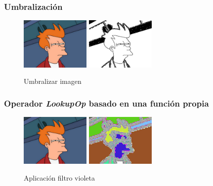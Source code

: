 \subsubsection{Umbralización}
\vskip0.3cm
\begin{figure}[H]
 \centering
  \includegraphics[width=0.3\textwidth]{imagenes/Fry.jpg}
  \includegraphics[width=0.3\textwidth]{imagenes/fryUmbralizado.jpg}
 \caption{Umbralizar imagen}
 \label{diseño}
\end{figure}
\subsubsection{Operador \textit{LookupOp} basado en una función propia}
\vskip0.3cm
\begin{figure}[H]
 \centering
  \includegraphics[width=0.3\textwidth]{imagenes/Fry.jpg}
  \includegraphics[width=0.3\textwidth]{imagenes/fryCos.jpg}
 \caption{Aplicación filtro violeta}
 \label{diseño}
 \end{figure}
